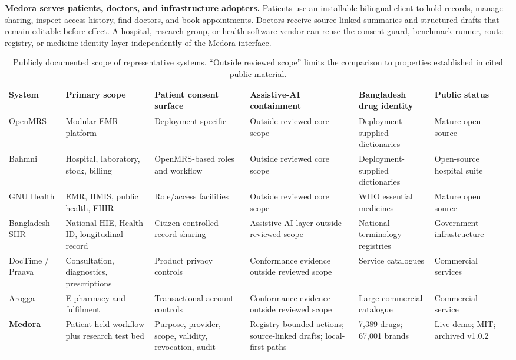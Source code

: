 \documentclass[12pt,twocolumn,a4paper]{article}
\begin{document}
\textbf{Medora serves patients, doctors, and infrastructure adopters.} Patients use an
installable bilingual client to hold records, manage sharing, inspect access history, find
doctors, and book appointments. Doctors receive source-linked summaries and structured
drafts that remain editable before effect. A hospital, research group, or health-software
vendor can reuse the consent guard, benchmark runner, route registry, or medicine identity
layer independently of the Medora interface.

\begin{table}[!t]
\caption{Publicly documented scope of representative systems. ``Outside reviewed scope''
limits the comparison to properties established in cited public material.}
\label{tab:comparison}
\centering
\renewcommand{\arraystretch}{1.02}
\setlength{\tabcolsep}{3pt}
\begin{tabularx}{\textwidth}{@{}p{2.2cm}YYYYY@{}}
\toprule
System & Primary scope & Patient consent surface & Assistive-AI containment & Bangladesh drug identity & Public status \\
\midrule
OpenMRS & Modular EMR platform & Deployment-specific & Outside reviewed core scope & Deployment-supplied dictionaries & Mature open source~\cite{openmrs} \\
Bahmni & Hospital, laboratory, stock, billing & OpenMRS-based roles and workflow & Outside reviewed core scope & Deployment-supplied dictionaries & Open-source hospital suite~\cite{bahmni} \\
GNU Health & EMR, HMIS, public health, FHIR & Role/access facilities & Outside reviewed core scope & WHO essential medicines & Mature open source~\cite{gnuhealth} \\
Bangladesh SHR & National HIE, Health ID, longitudinal record & Citizen-controlled record sharing & Assistive-AI layer outside reviewed scope & National terminology registries & Government infrastructure~\cite{shr} \\
DocTime / Praava & Consultation, diagnostics, prescriptions & Product privacy controls & Conformance evidence outside reviewed scope & Service catalogues & Commercial services~\cite{doctime,praava} \\
Arogga & E-pharmacy and fulfilment & Transactional account controls & Conformance evidence outside reviewed scope & Large commercial catalogue & Commercial service~\cite{arogga} \\
\textbf{Medora} & Patient-held workflow plus research test bed & Purpose, provider, scope, validity, revocation, audit & Registry-bounded actions; source-linked drafts; local-first paths & 7,389 drugs; 67,001 brands & Live demo; MIT; archived v1.0.2~\cite{medoraarchive} \\
\bottomrule
\end{tabularx}
\end{table}
\end{document}
